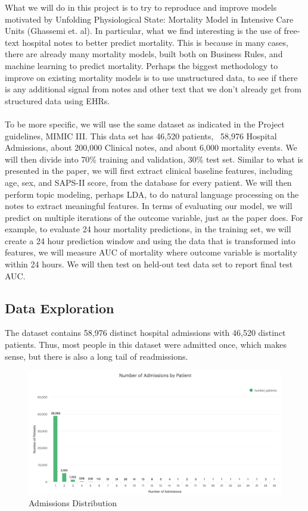 \documentclass[12pt, final]{article}
\begin{document}
What we will do in this project is to try to reproduce and improve models motivated by Unfolding Physiological State: Mortality Model in Intensive Care Units (Ghassemi et. al). In particular, what we find interesting is the use of free-text hospital notes to better predict mortality. This is because in many cases, there are already many mortality models, built both on Business Rules, and machine learning to predict mortality. Perhaps the biggest methodology to improve on existing mortality models is to use unstructured data, to see if there is any additional signal from notes and other text that we don't already get from structured data using EHRs.
\\
\\
To be more specific, we will use the same dataset as indicated in the Project guidelines, MIMIC III. This data set has 46,520 patients, ~58,976 Hospital Admissions, about 200,000 Clinical notes, and about 6,000 mortality events. We will then divide into 70\% training and validation, 30\% test set. Similar to what is presented in the paper, we will first extract clinical baseline features, including age, sex, and SAPS-II score, from the database for every patient. We will then perform topic modeling, perhaps LDA, to do natural language processing on the notes to extract meaningful features. In terms of evaluating our model, we will predict on multiple iterations of the outcome variable, just as the paper does. For example, to evaluate 24 hour mortality predictions, in the training set, we will create a 24 hour prediction window and using the data that is transformed into features, we will measure AUC of mortality where outcome variable is mortality within 24 hours. We will then test on held-out test data set to report final test AUC.

\subsection{Data Exploration}
\label{Data Exploration}
The dataset contains 58,976 distinct hospital admissions with 46,520 distinct patients. Thus, most people in this dataset were admitted once, which makes sense, but there is also a long tail of readmissions.

\begin{figure}[H]
\centering
\caption{Admissions Distribution}
\label{AdmissionsDistribution}
\includegraphics[page = {1}, scale = 0.4]{./images/admissions-distribution.png}
\end{figure}
\end{document}
